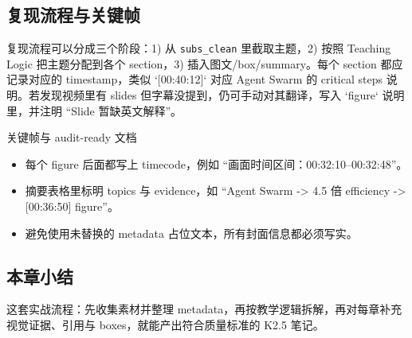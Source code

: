 \subsection{复现流程与关键帧}
复现流程可以分成三个阶段：1) 从 \texttt{subs\_clean} 里截取主题，2) 按照 Teaching Logic 把主题分配到各个 section，3) 插入图文/box/summary。每个 section 都应记录对应的 timestamp，类似 `[00:40:12]` 对应 Agent Swarm 的 critical steps 说明。若发现视频里有 slides 但字幕没提到，仍可手动对其翻译，写入 `figure` 说明里，并注明 ``Slide 暂缺英文解释''。

\begin{knowledgebox}{关键帧与 audit-ready 文档}
\begin{itemize}
    \item 每个 figure 后面都写上 timecode，例如 ``画面时间区间：00:32:10--00:32:48''。
    \item 摘要表格里标明 topics 与 evidence，如 ``Agent Swarm -> 4.5 倍 efficiency -> [00:36:50] figure''。
    \item 避免使用未替换的 metadata 占位文本，所有封面信息都必须写实。
\end{itemize}
\end{knowledgebox}

\subsection{本章小结}
这套实战流程：先收集素材并整理 metadata，再按教学逻辑拆解，再对每章补充视觉证据、引用与 boxes，就能产出符合质量标准的 K2.5 笔记。

